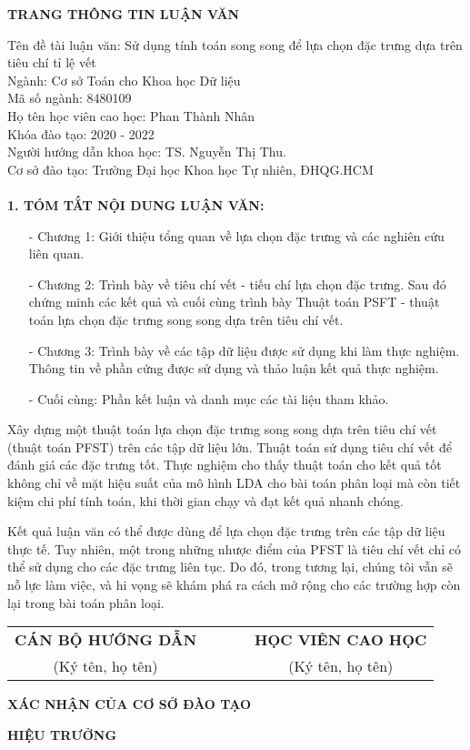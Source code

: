 \thispagestyle{empty}
\begin{center}
	\LARGE{\textbf{TRANG THÔNG TIN LUẬN VĂN}}
\end{center}

\noindent Tên đề tài luận văn: Sử dụng tính toán song song để lựa chọn đặc trưng dựa trên tiêu chí tỉ lệ vết
\\
Ngành: Cơ sở Toán cho Khoa học Dữ liệu
\\
Mã số ngành: 8480109
\\
Họ tên học viên cao học: Phan Thành Nhân
\\
Khóa đào tạo: 2020 - 2022
\\
Người hướng dẫn khoa học: TS. Nguyễn Thị Thu.
\\
Cơ sở đào tạo: Trường Đại học Khoa học Tự nhiên, ĐHQG.HCM\\
\\
{\bf 1. TÓM TẮT NỘI DUNG LUẬN VĂN:}
\begin{itemize}
	\item[-] Chương 1: Giới thiệu tổng quan về lựa chọn đặc trưng và các nghiên cứu liên quan.
	\item[-] Chương 2: Trình bày về tiêu chí vết - tiếu chí lựa chọn đặc trưng. Sau đó chứng minh các kết quả và cuối cùng trình bày Thuật toán PSFT - thuật toán lựa chọn đặc trưng song song dựa trên tiêu chí vết.
	\item[-] Chương 3: Trình bày về các tập dữ liệu được sử dụng khi làm thực nghiệm. Thông tin về phần cứng được sử dụng và thảo luận kết quả thực nghiệm.
 	\item[-] Cuối cùng: Phần kết luận và danh mục các tài liệu tham khảo.
	
\end{itemize}


Xây dựng một thuật toán lựa chọn đặc trưng song song dựa trên tiêu chí vết (thuật toán PFST) trên các tập dữ liệu lớn. Thuật toán sử dụng tiêu chí vết để đánh giá các đặc trưng tốt. Thực nghiệm cho thấy thuật toán cho kết quả tốt không chỉ về mặt hiệu suất của mô hình LDA cho bài toán phân loại mà còn tiết kiệm chi phí tính toán, khi thời gian chạy và đạt kết quả nhanh chóng.

Kết quả luận văn có thể được dùng để lựa chọn đặc trưng trên các tập dữ liệu thực tế. Tuy nhiên, một trong những nhược điểm của PFST là tiêu chí vết chỉ có thể sử dụng cho các đặc trưng liên tục. Do đó, trong tương lại, chúng tôi vẫn sẽ nỗ lực làm việc, và hi vọng sẽ khám phá ra cách mở rộng cho các trường hợp còn lại trong bài toán phân loại.
\newpage

\begin{tabular}{ccccc}
 {\bf CÁN BỘ HƯỚNG DẪN}	&&&& {\bf HỌC VIÊN CAO HỌC} \\
 (Ký tên, họ tên) &&&& (Ký tên, họ tên) \\
\end{tabular}

\vspace{3cm}

\begin{center}
{\bf XÁC NHẬN CỦA CƠ SỞ ĐÀO TẠO}

{\bf HIỆU TRƯỞNG}
\end{center}
\thispagestyle{empty}